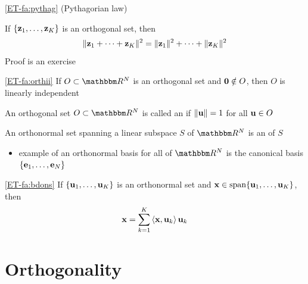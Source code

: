 \begin{frame}

    \vspace{2em}
    \Fact\eqref{ET-fa:pythag}
        (Pythagorian law)
        
        If $\{{\mathbf z}_1,\ldots, {\mathbf z}_K\}$ is an orthogonal set, then
        \begin{equation*}
            \| {\mathbf z}_1 + \cdots + {\mathbf z}_K \|^2 
            = \| {\mathbf z}_1 \|^2 + \cdots + \| {\mathbf z}_K \|^2 
        \end{equation*}
    Proof is an exercise 
    
    \vspace{.7em}
    \Fact\eqref{ET-fa:orthii}
    If $O \subset \RR^N$ is an orthogonal set and ${\mathbf 0} \notin O$, then
    $O$ is linearly independent
    
\end{frame}

\begin{frame}
    
    \vspace{2em}
    An orthogonal set $O \subset \RR^N$ is called an  
    if $\|{\mathbf u} \| = 1$ for all ${\mathbf u} \in O$

    An orthonormal set spanning a linear
    subspace $S$ of $\RR^N$ is  an  of $S$
    
    \begin{itemize}
        \item example of an orthonormal basis for all of $\RR^N$ is the canonical
        basis $\{{\mathbf e}_1, \ldots, {\mathbf e}_N\}$
    \end{itemize}
    
    \vspace{1em}
    \Fact\eqref{ET-fa:bdons}
    If $\{{\mathbf u}_1, \ldots, {\mathbf u}_K\}$ is an orthonormal set
    and ${\mathbf x} \in \operatorname{span}\{{\mathbf u}_1, \ldots, {\mathbf u}_K\}$, then
    \begin{equation*}
        \label{eq:exbyob}
        {\mathbf x} = \sum_{k=1}^K \left\langle{ {\mathbf x} ,  {\mathbf u} _k}\right\rangle {\mathbf u}_k
    \end{equation*}
\end{frame}

\section{Orthogonality}

